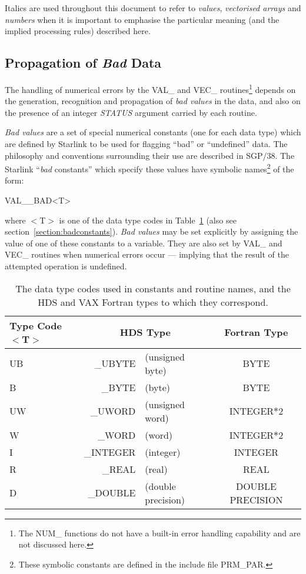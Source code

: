 \documentclass[11pt,nolof]{starlink}
\providecommand{\name}[1]{\mbox{#1}}
\providecommand{\fortvar}[1]{\mbox{\emph{#1}}}
\begin{document}
Italics are used throughout this document to refer to \emph{values}, \emph{vectorised arrays} and \emph{numbers} when it is important to emphasise the
particular meaning (and the implied processing rules) described here.

\subsection{Propagation of \emph{Bad} Data}
\label{section:bad}

The handling of numerical errors by the \name{VAL\_} and \name{VEC\_}
routines\footnote{The \name{NUM\_} functions do not have a built-in error
handling capability and are not discussed here.}  depends on the generation,
recognition and propagation of \emph{bad values} in the data, and also on
the presence of an integer \fortvar{STATUS} argument carried by each
routine.

\emph{Bad values} are a set of special numerical constants (one for each data
type) which are defined by Starlink to be used for flagging ``bad'' or
``undefined'' data.
The philosophy and conventions surrounding their use are described in SGP/38.
The Starlink ``\emph{bad} constants'' which specify these values have
symbolic names\footnote{
These symbolic constants are defined in the include file \name{PRM\_PAR}.}
of the form:

\begin{terminalv}
VAL__BAD<T>
\end{terminalv}

where \name{$<$T$>$} is one of the data type codes in
Table~\ref{table:types} (also see section~\ref{section:badconstants}).
\emph{Bad values} may be set explicitly by assigning the value of one of
these constants to a variable.
They are also set by \name{VAL\_} and \name{VEC\_} routines when numerical
errors occur --- implying that the result of the attempted operation is
undefined.

\begin{table}
\begin{center}
\begin{tabular}{|l|rl|c|}
\hline
\textbf{Type Code $<$T$>$} &
\multicolumn{2}{|c|}{\textbf{HDS Type}} & \textbf{Fortran Type } \\
\hline
UB & \_UBYTE & (unsigned byte) & BYTE \\
B & \_BYTE & (byte) & BYTE \\
UW & \_UWORD & (unsigned word) & INTEGER$*$2 \\
W & \_WORD & (word) & INTEGER$*$2 \\
I & \_INTEGER & (integer) & INTEGER \\
R & \_REAL & (real) & REAL \\
D & \_DOUBLE & (double precision) & DOUBLE PRECISION \\
\hline
\end{tabular}
\caption{The data type codes used in constants and routine names, and the
\name{HDS} and \name{VAX} Fortran types to which they correspond.}
\label{table:types}
\end{center}
\end{table}
\end{document}
